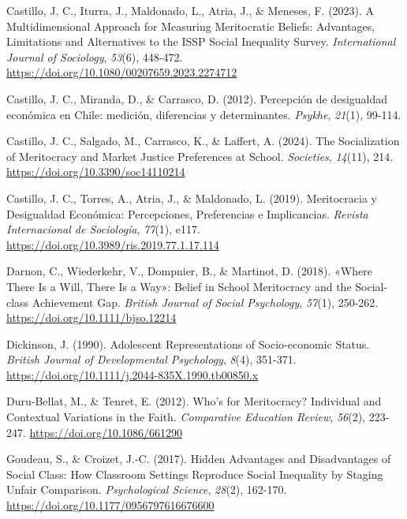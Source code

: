 \documentclass[
  spanish,
  a4paper,
  oneside]{scrbook}
\newlength{\cslhangindent}
\newenvironment{CSLReferences}[2] %
 {\begin{list}{}{%
  \setlength{\itemindent}{0pt}
  \setlength{\leftmargin}{0pt}
  \setlength{\parsep}{0pt}
  \ifodd #1
   \setlength{\leftmargin}{\cslhangindent}
   \setlength{\itemindent}{-1\cslhangindent}
  \fi
  \setlength{\itemsep}{#2\baselineskip}}}
 {\end{list}}
\begin{document}
\begin{CSLReferences}{1}{0}
Castillo, J. C., Iturra, J., Maldonado, L., Atria, J., \& Meneses, F.
(2023). A {Multidimensional Approach} for {Measuring Meritocratic
Beliefs}: {Advantages}, {Limitations} and {Alternatives} to the {ISSP
Social Inequality Survey}. \emph{International Journal of Sociology},
\emph{53}(6), 448-472.
\url{https://doi.org/10.1080/00207659.2023.2274712}

Castillo, J. C., Miranda, D., \& Carrasco, D. (2012). Percepción de
desigualdad económica en Chile: medición, diferencias y determinantes.
\emph{Psykhe}, \emph{21}(1), 99-114.

Castillo, J. C., Salgado, M., Carrasco, K., \& Laffert, A. (2024). The
{Socialization} of {Meritocracy} and {Market Justice Preferences} at
{School}. \emph{Societies}, \emph{14}(11), 214.
\url{https://doi.org/10.3390/soc14110214}

Castillo, J. C., Torres, A., Atria, J., \& Maldonado, L. (2019).
Meritocracia y Desigualdad Económica: {Percepciones}, Preferencias e
Implicancias. \emph{Revista Internacional de Sociología}, \emph{77}(1),
e117. \url{https://doi.org/10.3989/ris.2019.77.1.17.114}

Darnon, C., Wiederkehr, V., Dompnier, B., \& Martinot, D. (2018).
{«{Where} There Is a Will, There Is a Way»}: {Belief} in School
Meritocracy and the Social-class Achievement Gap. \emph{British Journal
of Social Psychology}, \emph{57}(1), 250-262.
\url{https://doi.org/10.1111/bjso.12214}

Dickinson, J. (1990). Adolescent Representations of Socio-economic
Status. \emph{British Journal of Developmental Psychology}, \emph{8}(4),
351-371. \url{https://doi.org/10.1111/j.2044-835X.1990.tb00850.x}

Duru-Bellat, M., \& Tenret, E. (2012). Who's for Meritocracy?
{Individual} and Contextual Variations in the Faith. \emph{Comparative
Education Review}, \emph{56}(2), 223-247.
\url{https://doi.org/10.1086/661290}

Goudeau, S., \& Croizet, J.-C. (2017). Hidden Advantages and
Disadvantages of Social Class: {How} Classroom Settings Reproduce Social
Inequality by Staging Unfair Comparison. \emph{Psychological Science},
\emph{28}(2), 162-170. \url{https://doi.org/10.1177/0956797616676600}


\end{CSLReferences}
\end{document}
